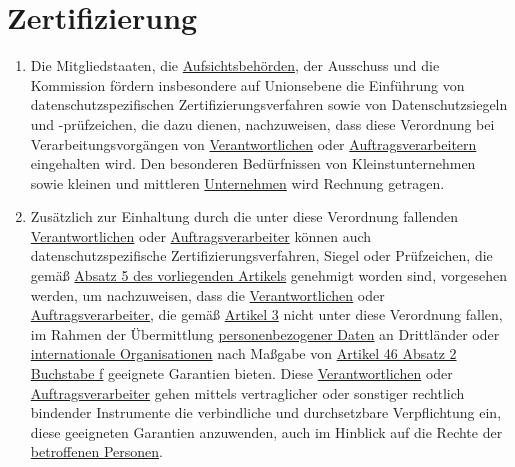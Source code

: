 \chapter{Zertifizierung}
\label{ch:42}


\begin{enumerate}

  \item Die Mitgliedstaaten, die \hyperref[itm:04-21]{Aufsichtsbehörden}, der Ausschuss und die Kommission fördern
   insbesondere auf Unionsebene die Einführung von datenschutzspezifischen Zertifizierungsverfahren sowie von
   Datenschutzsiegeln und -prüfzeichen, die dazu dienen, nachzuweisen, dass diese Verordnung bei Verarbeitungsvorgängen
   von \hyperref[itm:04-7]{Verantwortlichen} oder \hyperref[itm:04-8]{Auftragsverarbeitern} eingehalten wird.
    Den besonderen
    Bedürfnissen von Kleinstunternehmen sowie kleinen und mittleren \hyperref[itm:04-18]{Unternehmen} wird Rechnung
    getragen.%
  \label{itm:42-1}

  \item Zusätzlich zur Einhaltung durch die unter diese Verordnung fallenden \hyperref[itm:04-7]
   {Verantwortlichen} oder \hyperref[itm:04-8]{Auftragsverarbeiter} können auch datenschutzspezifische
   Zertifizierungsverfahren, Siegel oder Prüfzeichen, die gemäß \hyperref[itm:42-5]{Absatz 5 des vorliegenden Artikels}
   genehmigt worden sind, vorgesehen werden, um nachzuweisen, dass die
   \hyperref[itm:04-7]{Verantwortlichen} oder \hyperref[itm:04-8]{Auftragsverarbeiter}, die gemäß \hyperref[ch:3]
    {Artikel 3} nicht unter diese Verordnung fallen, im Rahmen der Übermittlung \hyperref[itm:04-1]
    {personenbezogener Daten} an Drittländer oder \hyperref[itm:04-26]{internationale Organisationen} nach Maßgabe
    von \hyperref[itm:46-2f]{Artikel 46 Absatz 2 Buchstabe f} geeignete Garantien bieten. Diese \hyperref[itm:04-7]
    {Verantwortlichen} oder \hyperref[itm:04-8]{Auftragsverarbeiter} gehen mittels vertraglicher oder sonstiger
    rechtlich bindender Instrumente die verbindliche und durchsetzbare Verpflichtung ein, diese geeigneten Garantien
    anzuwenden, auch im Hinblick auf die Rechte der
   \hyperref[itm:04-1]{betroffenen Personen}.%
  \label{itm:42-2}


\end{enumerate}
